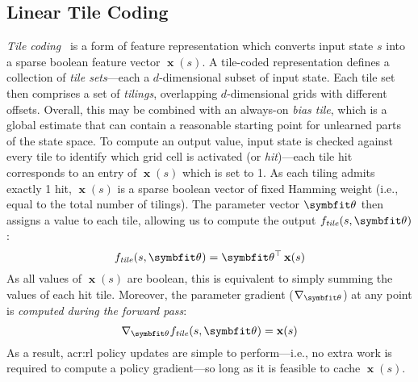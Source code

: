 \subsection{Linear Tile Coding}
\emph{Tile coding}~\parencite[pp.~\numrange{217}{221}]{RL2E} is a form of feature representation which converts input state $s$ into a sparse boolean feature vector $\operatorname{\mathbf{x}}(s)$.
A tile-coded representation defines a collection of \emph{tile sets}---each a $d$-dimensional subset of input state.
Each tile set then comprises a set of \emph{tilings}, overlapping $d$-dimensional grids with different offsets.
Overall, this may be combined with an always-on \emph{bias tile}, which is a global estimate that can contain a reasonable starting point for unlearned parts of the state space.
To compute an output value, input state is checked against every tile to identify which grid cell is activated (or \emph{hit})---each tile hit corresponds to an entry of $\operatorname{\mathbf{x}}(s)$ which is set to 1.
As each tiling admits exactly 1 hit, $\operatorname{\mathbf{x}}(s)$ is a sparse boolean vector of fixed Hamming weight (i.e., equal to the total number of tilings).
The parameter vector $\wvec{}$ then assigns a value to each tile, allowing us to compute the output $f_\mathit{tile}(s, \wvec{})$:
\begin{equation}
	f_\mathit{tile}(s, \wvec{}) = \wvec{}^{\top} \operatorname{\mathbf{x}}(s)
	\label{eqn:lin-approx}
\end{equation}
As all values of $\operatorname{\mathbf{x}}(s)$ are boolean, this is equivalent to simply summing the values of each hit tile.
Moreover, the parameter gradient ($\nabla_{\wvec{}}$) at any point is \emph{computed during the forward pass}:
\begin{equation}
	\nabla_{\wvec{}}{f_\mathit{tile}(s, \wvec{})} = \operatorname{\mathbf{x}}(s)
\end{equation}
As a result, \gls{acr:rl} policy updates are simple to perform---i.e., no extra work is required to compute a policy gradient---so long as it is feasible to cache $\operatorname{\mathbf{x}}(s)$.

